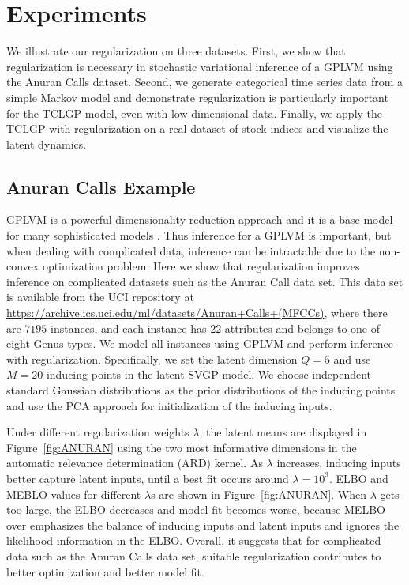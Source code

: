 \documentclass{article}
\begin{document}
\section{Experiments} \label{sec:E}
We illustrate our regularization on three datasets. First, we show that regularization is necessary in stochastic variational inference of a GPLVM using the Anuran Calls dataset. Second, we generate categorical time series data from a simple Markov model and demonstrate regularization is particularly important for the TCLGP model, even with low-dimensional data. Finally, we apply the TCLGP with regularization on a real dataset of stock indices and visualize the latent dynamics.

\subsection{Anuran Calls Example} \label{sec:Anuran}
GPLVM is a powerful dimensionality reduction approach \citep{Lawrence_2003, Lawrence_2007} and it is a base model for many sophisticated models \citep{Lawrence_2007_HGP, Urtasun_2007, Damianou_2016}. Thus inference for a GPLVM is important, but when dealing with complicated data, inference can be intractable due to the non-convex optimization problem. Here we show that regularization improves inference on complicated datasets such as the Anuran Call data set. This data set is available from the UCI repository at \url{https://archive.ics.uci.edu/ml/datasets/Anuran+Calls+(MFCCs)}, where there are $7195$ instances, and each instance has $22$ attributes and belongs to one of eight Genus types. We model all instances using GPLVM and perform inference with regularization. Specifically, we set the latent dimension $Q = 5$ and use $M = 20$ inducing points in the latent SVGP model. We choose independent standard Gaussian distributions as the prior distributions of the inducing points and use the PCA approach for initialization of the inducing inputs.

Under different regularization weights $\lambda$, the latent means are displayed in Figure~\ref{fig:ANURAN} using the two most informative dimensions in the automatic relevance determination (ARD) kernel. As $\lambda$ increases, inducing inputs better capture latent inputs, until a best fit occurs around $\lambda = 10^3$. ELBO and MEBLO values for different $\lambda$s are shown in Figure~\ref{fig:ANURAN}. When $\lambda$ gets too large, the ELBO decreases and model fit becomes worse, because MELBO over emphasizes the balance of inducing inputs and latent inputs and ignores the likelihood information in the ELBO. Overall, it suggests that for complicated data such as the Anuran Calls data set, suitable regularization contributes to better optimization and better model fit.
\end{document}
